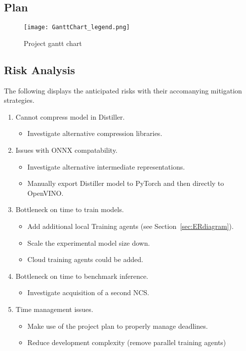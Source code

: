 \documentclass[../../D1.tex]{subfiles}
\begin{document}
\subsection{Plan}

\begin{figure}[h]
    \texttt{[image: GanttChart\_legend.png]}
    \caption{Project gantt chart}
    \label{fig:ganttChart}
\end{figure}

\subsection{Risk Analysis}
The following displays the anticipated risks with their accomanying mitigation strategies.
\begin{enumerate}
    \item Cannot compress model in Distiller.
    \begin{itemize}
        \item Investigate alternative compression libraries.
    \end{itemize}

    \item Issues with ONNX compatability.
    \begin{itemize}
        \item Investigate alternative intermediate representations.
        \item Manually export Distiller model to PyTorch and then directly to OpenVINO.
    \end{itemize}

    \item Bottleneck on time to train models.
    \begin{itemize}
        \item Add additional local Training agents (see Section~\ref{sec:ERdiagram}).
        \item Scale the experimental model size down.
        \item Cloud training agents could be added.
    \end{itemize}

    \item Bottleneck on time to benchmark inference.
    \begin{itemize}
        \item Investigate acquisition of a second NCS.
    \end{itemize}

    \item Time management issues.
    \begin{itemize}
        \item Make use of the project plan to properly manage deadlines.
        \item Reduce development complexity (remove parallel training agents)
    \end{itemize}


\end{enumerate}
\end{document}
